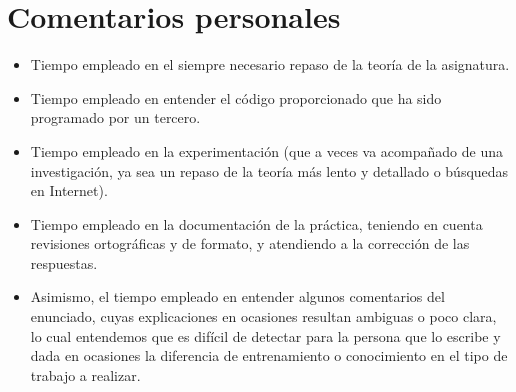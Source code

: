 \documentclass[10pt, spanish, pdftex]{../.template/template}
\begin{document}
\section{Comentarios personales}
\begin{itemize}
    \item Tiempo empleado en el siempre necesario repaso de la teoría de la asignatura.
    \item Tiempo empleado en entender el código proporcionado que ha sido programado por un tercero.
    \item Tiempo empleado en la experimentación (que a veces va acompañado de una investigación, ya sea un repaso de la teoría más lento y detallado o búsquedas en Internet).
    \item Tiempo empleado en la documentación de la práctica, teniendo en cuenta revisiones ortográficas y de formato, y atendiendo a la corrección de las respuestas.
    \item Asimismo, el tiempo empleado en entender algunos comentarios del enunciado, cuyas explicaciones en ocasiones resultan ambiguas o poco clara, lo cual entendemos que es difícil de detectar para la persona que lo escribe y dada en ocasiones la diferencia de entrenamiento o conocimiento en el tipo de trabajo a realizar.
\end{itemize}
\end{document}
